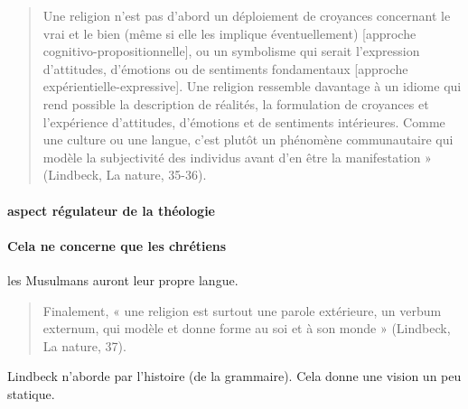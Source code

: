  \begin{quote}
     Une religion n’est pas d’abord un déploiement de croyances concernant le vrai et le bien (même si
elle les implique éventuellement) [approche cognitivo-propositionnelle], ou un symbolisme qui serait
l’expression d’attitudes, d’émotions ou de sentiments fondamentaux [approche expérientielle-expressive].
Une religion ressemble davantage à un idiome qui rend possible la description de réalités,
la formulation de croyances et l’expérience d’attitudes, d’émotions et de sentiments intérieures.
Comme une culture ou une langue, c’est plutôt un phénomène communautaire qui modèle la
subjectivité des individus avant d’en être la manifestation » (Lindbeck, La nature, 35-36).
 \end{quote}

\paragraph{aspect régulateur de la théologie}
 \paragraph{Cela ne concerne que les chrétiens} les Musulmans auront leur propre langue. 

 \begin{quote}
     Finalement, « une religion est surtout une parole extérieure, un verbum externum, qui modèle et donne
forme au soi et à son monde » (Lindbeck, La nature, 37).
 \end{quote}

 \begin{Prop}
 Lindbeck n'aborde par l'histoire (de la grammaire). Cela donne une vision un peu statique. 
 \end{Prop}